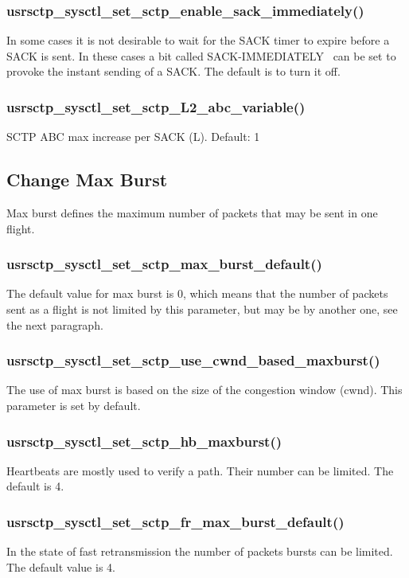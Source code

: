 \documentclass[a4paper]{article}
\begin{document}
\subsubsection{usrsctp\_sysctl\_set\_sctp\_enable\_sack\_immediately()}
In some cases it is not desirable to wait for the SACK timer to expire before a SACK is sent. In these
cases a bit called SACK-IMMEDIATELY~\cite{sack-imm} can be set to provoke the instant sending of a SACK. 
The default is to turn it off. 

\subsubsection{usrsctp\_sysctl\_set\_sctp\_L2\_abc\_variable()}
SCTP ABC max increase per SACK (L). Default: 1

\subsection{Change Max Burst}
Max burst defines the maximum number of packets that may be sent in one flight.

\subsubsection{usrsctp\_sysctl\_set\_sctp\_max\_burst\_default()}
The default value for max burst is 0, which means that the number of packets sent as a flight
is not limited by this parameter, but may be by another one, see the next paragraph.

\subsubsection{usrsctp\_sysctl\_set\_sctp\_use\_cwnd\_based\_maxburst()}
The use of max burst is based on the size of the congestion window (cwnd). 
This parameter is set by default.

\subsubsection{usrsctp\_sysctl\_set\_sctp\_hb\_maxburst()}
Heartbeats are mostly used to verify a path. Their number can be limited. The default is 4.

\subsubsection{usrsctp\_sysctl\_set\_sctp\_fr\_max\_burst\_default()}
In the state of fast retransmission the number of packets bursts can be limited. The default
value is 4.
\end{document}
